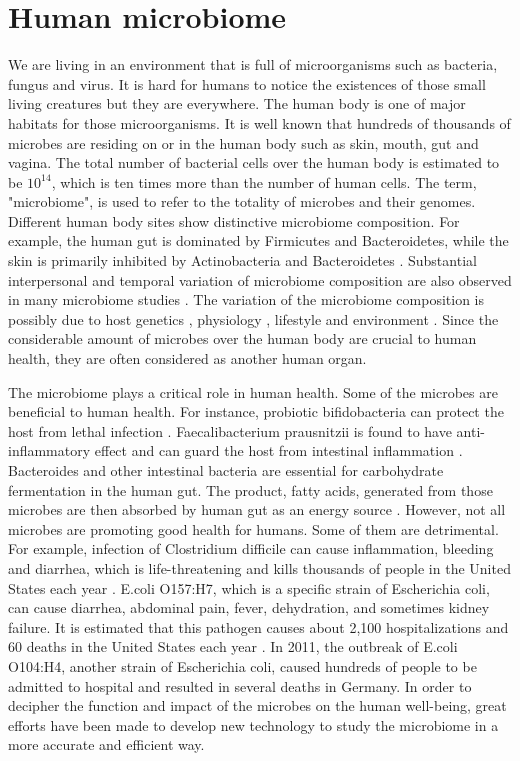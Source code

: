  \label{chpt:intro}

\section{Human microbiome}
We are living in an environment that is full of microorganisms such as bacteria, fungus and virus. It is hard for humans to notice the existences of those small living creatures but they are everywhere.  The human body is one of major habitats for those microorganisms. It is well known that hundreds of thousands of microbes are residing on or in the human body such as skin, mouth, gut and vagina. The total number of bacterial cells over the human body is estimated to be $10^{14}$, which is ten times more than the number of human cells. The term, "microbiome", is used to refer to the totality of microbes and their genomes. Different human body sites show distinctive microbiome composition. For example, the human gut is dominated by Firmicutes and Bacteroidetes, while the skin is primarily inhibited by Actinobacteria and Bacteroidetes \citep{Cho:2012cn}. Substantial interpersonal and temporal variation of microbiome composition are also observed in many microbiome studies \citep{turnbaugh2007human}. The variation of the microbiome composition is possibly due to host genetics \citep{Knights:2014jta}, physiology \citep{Sommer:2013hq}, lifestyle \citep{wu2011linking} and environment \citep{Adams:2015ga}. Since the considerable amount of microbes over the human body are crucial to human health, they are often considered as another human organ.

The microbiome plays a critical role in human health. Some of the microbes are beneficial to human health. For instance, probiotic bifidobacteria can protect the host from lethal infection \citep{Fukuda:2012hg}. Faecalibacterium prausnitzii is found to have anti-inflammatory effect and can guard the host from intestinal inflammation \citep{Sokol:2008ke}. Bacteroides and other intestinal bacteria are essential for carbohydrate fermentation in the human gut. The product, fatty acids, generated from those microbes are then absorbed by human gut as an energy source \citep{Wexler:2007cn}. However, not all microbes are promoting good health for humans. Some of them are detrimental. For example, infection of Clostridium difficile can cause inflammation, bleeding and diarrhea, which is life-threatening and kills thousands of people in the United States each year \citep{Lessa:2015wl}. E.coli O157:H7, which is a specific strain of Escherichia coli, can cause diarrhea, abdominal pain, fever, dehydration, and sometimes kidney failure. It is estimated that this pathogen causes about 2,100 hospitalizations and 60 deaths in the United States each year \citep{Berkenpas:2006wl}. In 2011, the outbreak of  E.coli O104:H4, another strain of Escherichia coli,  caused hundreds of people to be admitted to hospital and resulted in several deaths in Germany. In order to decipher the function and impact of the microbes on the human well-being, great efforts have been made to develop new technology to study the microbiome in a more accurate and efficient way.

